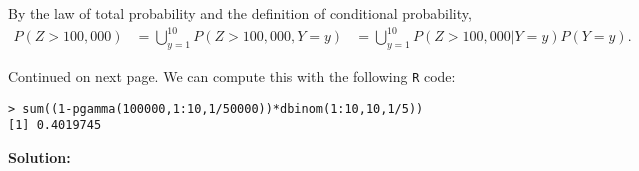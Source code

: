 \documentclass{homework}
\begin{document}

\begin{solution}
  By the law of total probability and the definition of conditional probability, 
  \begin{align*}
    P(Z>100,000) 
    &= \bigcup_{y=1}^{10} P(Z>100,000,Y=y)
    &= \bigcup_{y=1}^{10} P(Z>100,000|Y=y)P(Y=y).
  \end{align*}

  Continued on next page.
\newpage 
  We can compute this with the following \texttt{R} code:
\begin{verbatim}
> sum((1-pgamma(100000,1:10,1/50000))*dbinom(1:10,10,1/5))
[1] 0.4019745
\end{verbatim}
\end{solution}


\textbf{Solution:}
\end{document}
